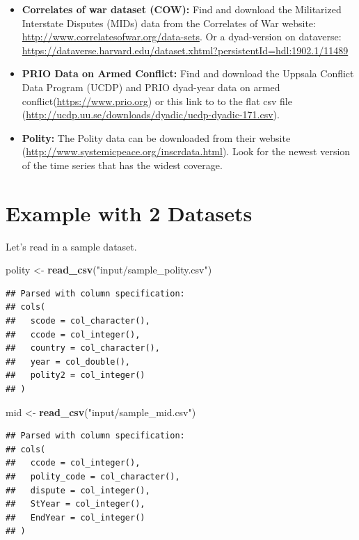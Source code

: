 \documentclass[]{book}
\newenvironment{Shaded}{\begin{snugshade}}{\end{snugshade}}
\newcommand{\KeywordTok}[1]{\textcolor[rgb]{0.13,0.29,0.53}{\textbf{#1}}}
\newcommand{\StringTok}[1]{\textcolor[rgb]{0.31,0.60,0.02}{#1}}
\newcommand{\NormalTok}[1]{#1}
\providecommand{\tightlist}{%
  \setlength{\itemsep}{0pt}\setlength{\parskip}{0pt}}
\theoremstyle{definition}
\theoremstyle{definition}
\theoremstyle{definition}
\theoremstyle{remark}
\begin{document}
\begin{itemize}
\tightlist
\item
  \textbf{Correlates of war dataset (COW):} Find and download the
  Militarized Interstate Disputes (MIDs) data from the Correlates of War
  website: \url{http://www.correlatesofwar.org/data-sets}. Or a
  dyad-version on dataverse:
  \url{https://dataverse.harvard.edu/dataset.xhtml?persistentId=hdl:1902.1/11489}
\item
  \textbf{PRIO Data on Armed Conflict:} Find and download the Uppsala
  Conflict Data Program (UCDP) and PRIO dyad-year data on armed
  conflict(\url{https://www.prio.org}) or this link to to the flat csv
  file (\url{http://ucdp.uu.se/downloads/dyadic/ucdp-dyadic-171.csv}).
\item
  \textbf{Polity:} The Polity data can be downloaded from their website
  (\url{http://www.systemicpeace.org/inscrdata.html}). Look for the
  newest version of the time series that has the widest coverage.
\end{itemize}

\section{Example with 2 Datasets}\label{example-with-2-datasets}

Let's read in a sample dataset.

\begin{Shaded}
\begin{Highlighting}[]
\NormalTok{polity <-}\StringTok{ }\KeywordTok{read_csv}\NormalTok{(}\StringTok{"input/sample_polity.csv"}\NormalTok{)}
\end{Highlighting}
\end{Shaded}

\begin{verbatim}
## Parsed with column specification:
## cols(
##   scode = col_character(),
##   ccode = col_integer(),
##   country = col_character(),
##   year = col_double(),
##   polity2 = col_integer()
## )
\end{verbatim}

\begin{Shaded}
\begin{Highlighting}[]
\NormalTok{mid <-}\StringTok{ }\KeywordTok{read_csv}\NormalTok{(}\StringTok{"input/sample_mid.csv"}\NormalTok{)}
\end{Highlighting}
\end{Shaded}

\begin{verbatim}
## Parsed with column specification:
## cols(
##   ccode = col_integer(),
##   polity_code = col_character(),
##   dispute = col_integer(),
##   StYear = col_integer(),
##   EndYear = col_integer()
## )
\end{verbatim}
\end{document}
